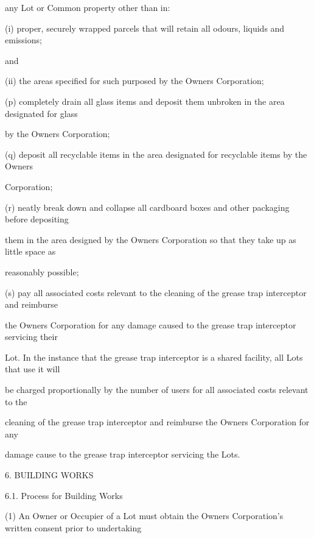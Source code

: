 \documentclass{article}
\begin{document}
{\fontsize{10.02}{1}any Lot or Common property other than in: }

{\fontsize{9.962}{1}(i) proper, securely wrapped parcels that will retain all odours, liquids and emissions; }

{\fontsize{10.02}{1}and }

\newpage

{\fontsize{9.962}{1}(ii) the areas specified for such purposed by the Owners Corporation; }

{\fontsize{9.962}{1}(p) completely drain all glass items and deposit them unbroken in the area designated for glass }

{\fontsize{10.02}{1}by the Owners Corporation;  }

{\fontsize{9.962}{1}(q) deposit all recyclable items in the area designated for recyclable items by the Owners }

{\fontsize{10.02}{1}Corporation; }

{\fontsize{9.962}{1}(r) neatly break down and collapse all cardboard boxes and other packaging before depositing }

{\fontsize{10.02}{1}them in the area designed by the Owners Corporation so that they take up as little space as }

{\fontsize{10.02}{1}reasonably possible; }

{\fontsize{9.962}{1}(s) pay all associated costs relevant to the cleaning of the grease trap interceptor and reimburse }

{\fontsize{10.02}{1}the Owners Corporation for any damage caused to the grease trap interceptor servicing their }

{\fontsize{10.02}{1}Lot. In the instance that the grease trap interceptor is a shared facility, all Lots that use it will }

{\fontsize{10.02}{1}be charged proportionally by the number of users for all associated costs relevant to the }

{\fontsize{10.02}{1}cleaning of the grease trap interceptor and reimburse the Owners Corporation for any }

{\fontsize{10.02}{1}damage cause to the grease trap interceptor servicing the Lots. }

{\fontsize{9.99}{1}6. BUILDING WORKS }

{\fontsize{9.99}{1}6.1. Process for Building Works }

{\fontsize{9.962}{1}(1) An Owner or Occupier of a Lot must obtain the Owners Corporation’s written consent prior to undertaking }
\end{document}
